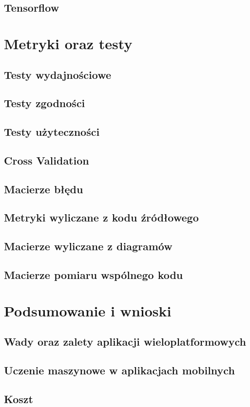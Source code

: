 \documentclass[brudnopis]{xmgr}
\begin{document}
\section{Tensorflow}

\chapter{Metryki oraz testy}

\section{Testy wydajnościowe}

\section{Testy zgodności}

\section{Testy użyteczności}

\section{Cross Validation}

\section{Macierze błędu}

\section{Metryki wyliczane z kodu źródłowego}

\section{Macierze wyliczane z diagramów}

\section{Macierze pomiaru wspólnego kodu}

\chapter{Podsumowanie i wnioski}

\section{Wady oraz zalety aplikacji wieloplatformowych}

\section{Uczenie maszynowe w aplikacjach mobilnych}

\section{Koszt}

\summary




\oswiadczenie
\end{document}
